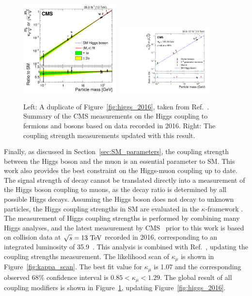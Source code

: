 \begin{figure}[!htb]
    \centering
    \captionsetup{justification=justified}
    \includegraphics[width=0.45\textwidth]{pics/Intro/higgs_coupling_2016.png}
    \includegraphics[width=0.45\textwidth]{pics/results/higgs_coupling_new.pdf}
    \caption{Left: A duplicate of Figure~\ref{fig:higgs_2016}, taken from Ref.~\cite{Sirunyan:2640611}. 
             Summary of the CMS measurements on the Higgs coupling to fermions and bosons based on data recorded in 2016.
             Right: The coupling strength measurements updated with this \hmm result.}
    \label{fig:higgs_coupling_new}
\end{figure}

Finally, as discussed in Section~\ref{sec:SM_parameters}, the coupling strength between the Higgs boson and the muon is an essential parameter to SM.
This work also provides the best constraint on the Higgs-muon coupling up to date.
The signal strength of \hmm decay cannot be translated directly into a measurement of the Higgs boson coupling to muons,
as the \hmm decay ratio is determined by all possible Higgs decays.
Assuming the Higgs boson does not decay to unknown particles, 
the Higgs coupling strengths in SM are evaluated in the $\kappa$-framework \cite{Heinemeyer:2013tqa}.
The measurement of Higgs coupling strengths is performed by combining many Higgs analyses,
and the latest measurement by CMS~\cite{Sirunyan:2640611} prior to this work is based on collision data at $\sqrt{s} = 13~\mbox{TeV}$ recorded in 2016, corresponding to an integrated luminosity of 35.9~\invfb.
This \hmm analysis is combined with Ref.~\cite{Sirunyan:2640611}, updating the coupling strengths measurement.
The likelihood scan of $\kappa_{\mu}$ is shown in Figure~\ref{fig:kappa_scan}.
The best fit value for $\kappa_{\mu}$ is 1.07 and the corresponding observed 68\% confidence interval is $0.85 < \kappa_{\mu} < 1.29$.
The global result of all coupling modifiers is shown in Figure~\ref{fig:higgs_coupling_new}, updating Figure~\ref{fig:higgs_2016}.


